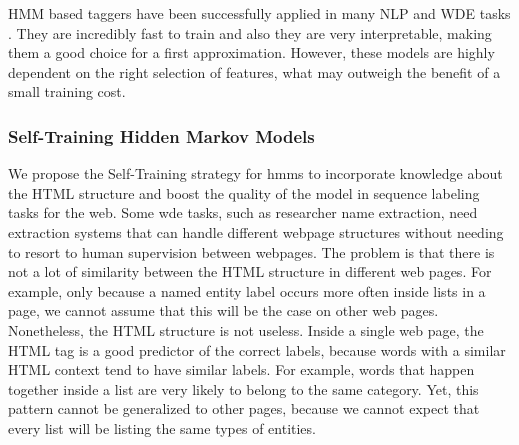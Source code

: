 \documentclass{nle}
\begin{document}
HMM based taggers have been successfully applied in many NLP and WDE tasks 
\cite{Rabiner1990,Freitag2000}. They are incredibly fast to train and also they are very 
interpretable, making them a good choice for a first approximation. However, these models 
are highly dependent on the right selection of features, what may outweigh the benefit of a 
small training cost.

\subsubsection{Self-Training Hidden Markov Models} 
\label{sssec:self_training}

We propose the Self-Training strategy for \gls{hmm}s to incorporate knowledge about the HTML structure
and boost the quality of the model in sequence labeling tasks for the web.
Some \gls{wde} tasks, such as researcher name extraction, need extraction systems
that can handle different webpage structures without needing to resort to human supervision
between webpages. 
The problem is that there is not a lot of similarity between the HTML structure in different web pages.
For example, only because a named entity label occurs more often inside lists in a page, we cannot
assume that this will be the case on other web pages. 
Nonetheless, the HTML structure is not useless. Inside a single web page, the HTML tag is a good predictor
of the correct labels, because words with a similar HTML context tend to have similar labels. For example, words
that happen together inside a list are very likely to belong to the same category. 
Yet, this pattern cannot be generalized to other pages, because we cannot expect that every list will
be listing the same types of entities.
\end{document}
